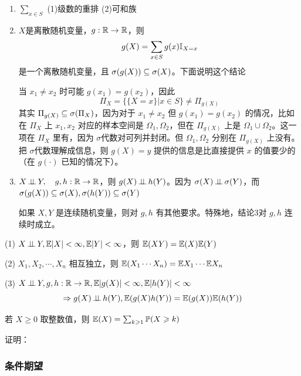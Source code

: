 \begin{remark}
    \quad 

    \begin{enumerate}
        \item $\sum_{x\in S}$ (1)级数的重排 (2)可和族
        \item $X$是离散随机变量，$g:\mathbb{R}\rightarrow\mathbb{R}$，则 
        \[
        g(X)=\sum_{x\in S}g(x)\mathbb I_{X=x}
        \]
        是一个离散随机变量，且 $\sigma(g(X))\subseteq \sigma(X)$。下面说明这个结论

        当 $x_1\neq x_2$ 时可能 $g(x_1)=g(x_2)$，因此
        \[
        \Pi_X=\{\{X=x\}|x\in S\}\neq \Pi_{g(X)}
        \]
        其实 $\Pi_{g(X)}\subseteq \sigma(\Pi_X)$，因为对于 $x_1\neq x_2$ 但 $g(x_1)=g(x_2)$ 的情况，比如在 $\Pi_X$ 上 $x_1,x_2$ 对应的样本空间是 $\Omega_1,\Omega_2$，但在 $\Pi_{g(X)}$ 上是 $\Omega_1\cup \Omega_2$。这一项在 $\Pi_X$ 里有，因为 $\sigma$代数对可列并封闭。但 $\Omega_1,\Omega_2$ 分别在 $\Pi_{g(X)}$ 上没有。把 $\sigma$代数理解成信息，则 $g(X)=y$ 提供的信息是比直接提供 $x$ 的值要少的（在 $g(\cdot)$ 已知的情况下）。

        \item $X\operatorname{\perp\!\!\!\perp} Y,\quad g, h:\mathbb{R}\rightarrow \mathbb{R}$，则 $g(X)\operatorname{\perp\!\!\!\perp} h(Y)$。因为 $\sigma(X)\operatorname{\perp\!\!\!\perp} \sigma(Y)$，而 $\sigma(g(X))\subseteq \sigma(X), \sigma(h(Y))\subseteq \sigma(Y)$
        
        如果 $X,Y$ 是连续随机变量，则对 $g,h$ 有其他要求。特殊地，结论3对 $g,h$ 连续时成立。
    \end{enumerate}
\end{remark}

\begin{theorem}
    (1) $X\operatorname{\perp\!\!\!\perp} Y, \mathbb E|X|<\infty, \mathbb E|Y|<\infty$，则 $\mathbb E(XY)=\mathbb E(X)\mathbb E(Y)$

    (2) $X_1,X_2,\cdots,X_n$ 相互独立，则 $\mathbb E(X_1\cdots X_n)=\mathbb E X_1\cdots \mathbb E X_n$

    (3) $X\operatorname{\perp\!\!\!\perp} Y, g,h:\mathbb{R}\rightarrow\mathbb{R}, \mathbb E|g(X)|<\infty, \mathbb E|h(Y)|<\infty$
    \[
    \Rightarrow g(X)\operatorname{\perp\!\!\!\perp} h(Y), \mathbb E(g(X)h(Y))=\mathbb E(g(X))\mathbb E(h(Y))
    \]
\end{theorem}

\begin{theorem}
    若 $X\geq 0$ 取整数值，则 $\mathbb E (X)=\sum_{k\geqslant 1}\mathbb{P}(X\geqslant k)$
\end{theorem}

证明：

\subsubsection{条件期望}

